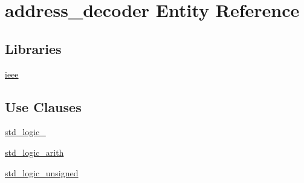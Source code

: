 \hypertarget{classaddress__decoder}{}\section{address\+\_\+decoder Entity Reference}
\label{classaddress__decoder}
\subsection*{Libraries}
 \begin{DoxyCompactItemize}
\item 
\hyperlink{classaddress__decoder_a208b4a843c28bfacfc6c74a4276b6bdc}{ieee} 
\end{DoxyCompactItemize}
\subsection*{Use Clauses}
 \begin{DoxyCompactItemize}
\item 
\hyperlink{classaddress__decoder_a857dcc5744990407561591d2d5707aa6}{std\+\_\+logic\+\_}   
\item 
\hyperlink{classaddress__decoder_abad2c79fa67df291d77257264ebeb001}{std\+\_\+logic\+\_\+arith}   
\item 
\hyperlink{classaddress__decoder_a267da23b46488123df8cd107a646dbb5}{std\+\_\+logic\+\_\+unsigned}   
\end{DoxyCompactItemize}
